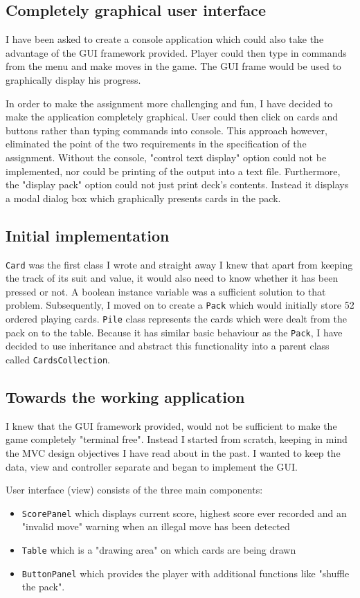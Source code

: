 \documentclass[a4paper, 11pt, titlepage]{article}
\begin{document}
\subsection{Completely graphical user interface}
I have been asked to create a console application which could also take the advantage of 
the GUI framework provided. Player could then type in commands from the menu and 
make moves in the game. The GUI frame would be used to graphically display his progress. 

In order to make the assignment more challenging and fun, I have decided to make the 
application completely graphical. User could then click on cards and buttons rather than
typing commands into console. This approach however, eliminated the point of the two 
requirements in the specification of the assignment. Without the console, "control text
display" option could not be implemented, nor could be printing of the output into a 
text file. Furthermore, the "display pack" option could not just print deck's contents.
Instead it displays a modal dialog box which graphically presents cards in the pack.

\subsection{Initial implementation}
\texttt{Card} was the first class I wrote and straight away I knew that apart from 
keeping the track of its suit and value, it would also need to know whether it has been
pressed or not. A boolean instance variable was a sufficient solution to that problem. 
Subsequently, I moved on to create a \texttt{Pack} which would initially store 52 ordered
playing cards. \texttt{Pile} class represents the cards which were dealt from the pack
on to the table. Because it has similar basic behaviour as the \texttt{Pack}, I have
decided to use inheritance and abstract this functionality into a parent class called
\texttt{CardsCollection}. 

\subsection{Towards the working application}
I knew that the GUI framework provided, would not be sufficient to make the game 
completely "terminal free". Instead I started from scratch, keeping in mind the MVC 
design objectives I have read about in the past. I wanted to keep the data, view and 
controller separate and began to implement the GUI. 

User interface (view) consists of the three main components:
\begin{itemize}
	\item \texttt{ScorePanel} which displays current score, highest score ever recorded
		and an "invalid move" warning when an illegal move has been detected
	
	\item \texttt{Table} which is a "drawing area" on which cards are being drawn
	
	\item \texttt{ButtonPanel} which provides the player with additional functions like
		"shuffle the pack". 
\end{itemize}
\end{document}
